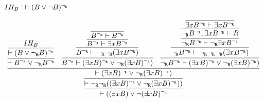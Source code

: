 \begin{enumerate}[(i)]
\begin{itemize}
            $IH_B : \; \vdash (B \vee \neg B)^{\neg_{\texttt{R}}}$
        
            $$
                \infer{
                    \vdash ((\exists x B) \vee \neg (\exists x B)^\ngr
                }{
                    \infer {
                        \vdash \ngr\ngr((\exists x B)^\ngr \vee \ngr (\exists x B)^\ngr))
                    }{
                        \infer {
                            \vdash (\exists x B)^\ngr \vee \ngr (\exists x B)^\ngr)
                        }{
                            \infer {
                                \vdash B^\ngr \vee \ngr B^\ngr
                            }{
                                \infer {
                                    \vdash (B \vee \ngr B)^\ngr
                                }{
                                    IH_B
                                }
                            }
                            &
                            \infer {
                                B^\ngr \vdash (\exists x B)^\ngr \vee \ngr (\exists x B)^\ngr)
                            }{
                                \infer {
                                    B^\ngr \vdash \ngr\ngr (\exists x B^\ngr)
                                }{
                                   \infer {
                                       B^\ngr \vdash \exists x B^\ngr
                                    }{
                                        \infer {
                                           B^\ngr \vdash B^\ngr
                                        }{
                                        }
                                    }
                                }
                            }
                            &
                            \infer {
                                \ngr B^\ngr \vdash (\exists x B)^\ngr \vee \ngr (\exists x B)^\ngr)
                            }{
                                \infer {
                                    \ngr B^\ngr \vdash \ngr\ngr\ngr(\exists x B^\ngr)
                                }{
                                   \infer {
                                       \ngr B^\ngr \vdash \ngr \exists x B^\ngr
                                    }{
                                        \infer {
                                           \ngr B^\ngr, \exists x B^\ngr \vdash R
                                        }{
                                            \infer {
                                               \exists x B^\ngr \vdash \exists x B^\ngr
                                            }{
                                            }
}}}}}}}$$
\end{itemize}
\end{enumerate}
